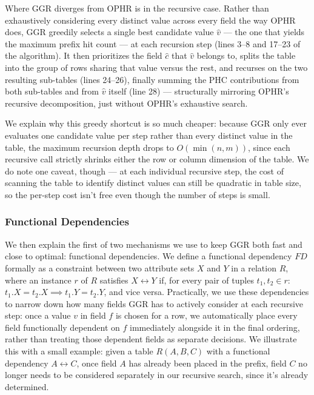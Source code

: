 \documentclass[manuscript,review]{acmart}
\begin{document}
Where GGR diverges from OPHR is in the recursive case. Rather than exhaustively considering every distinct value across every field the way OPHR does, GGR greedily selects a single best candidate value $\hat{v}$ — the one that yields the maximum prefix hit count — at each recursion step (lines 3–8 and 17–23 of the algorithm). It then prioritizes the field $\hat{c}$ that $\hat{v}$ belongs to, splits the table into the group of rows sharing that value versus the rest, and recurses on the two resulting sub-tables (lines 24–26), finally summing the PHC contributions from both sub-tables and from $\hat{v}$ itself (line 28) — structurally mirroring OPHR's recursive decomposition, just without OPHR's exhaustive search.

We explain why this greedy shortcut is so much cheaper: because GGR only ever evaluates one candidate value per step rather than every distinct value in the table, the maximum recursion depth drops to $O(\min(n,m))$, since each recursive call strictly shrinks either the row or column dimension of the table. We do note one caveat, though — at each individual recursive step, the cost of scanning the table to identify distinct values can still be quadratic in table size, so the per-step cost isn't free even though the number of steps is small.
\subsubsection{Functional Dependencies}
\label{FD}
We then explain the first of two mechanisms we use to keep GGR both fast and close to optimal: functional dependencies. We define a functional dependency $FD$ formally as a constraint between two attribute sets $X$ and $Y$ in a relation $R$, where an instance $r$ of $R$ satisfies $X \leftrightarrow Y$ if, for every pair of tuples $t_1, t_2 \in r$: $t_1.X = t_2.X \implies t_1.Y = t_2.Y$, and vice versa. Practically, we use these dependencies to narrow down how many fields GGR has to actively consider at each recursive step: once a value $v$ in field $f$ is chosen for a row, we automatically place every field functionally dependent on $f$ immediately alongside it in the final ordering, rather than treating those dependent fields as separate decisions. We illustrate this with a small example: given a table $R(A, B, C)$ with a functional dependency $A \leftrightarrow C$, once field $A$ has already been placed in the prefix, field $C$ no longer needs to be considered separately in our recursive search, since it's already determined.
\end{document}
